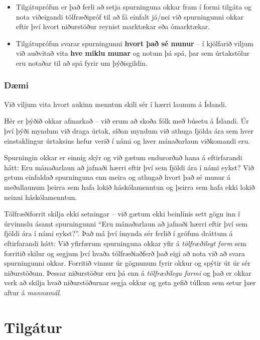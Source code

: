 \documentclass[
]{book}
\theoremstyle{definition}
\theoremstyle{definition}
\theoremstyle{definition}
\theoremstyle{definition}
\theoremstyle{remark}
\begin{document}
\begin{itemize}
  \begin{itemize}
  \item
    Tilgátuprófun er það ferli að setja spurninguna okkar fram í
    formi tilgáta og nota viðeigandi tölfræðipróf til að fá einfalt
    já/nei við spurningunni okkar eftir því hvort niðurstöður
    reynist marktækar eða ómarktækar.
  \item
    Tilgátuprófun svarar spurningunni \textbf{hvort það sé munur} -- í
    kjölfarið viljum við auðvitað vita \textbf{hve miklu munar} og notum
    þá spá, þar sem úrtakstölur eru notaðar til að spá fyrir um
    þýðisgildin.
  \end{itemize}
\end{itemize}

\hypertarget{duxe6mi}{%
\subsection*{Dæmi}\label{duxe6mi}}

Við viljum vita hvort aukinn menntun skili sér í hærri launum á Íslandi.

Hér er þýðið okkar afmarkað -- við erum að skoða fólk með búsetu á
Íslandi. Úr því þýði myndum við draga úrtak, síðan myndum við athuga
fjölda ára sem hver einstaklingur úrtaksins hefur verið í námi og hver
mánaðarlaun viðkomandi eru.

Spurningin okkar er einnig skýr og við gætum endurorðað hana á
eftirfarandi hátt: Eru mánaðarlaun að jafnaði hærri eftir því sem fjöldi
ára í námi eykst? Við getum einfaldað spurninguna enn meira og athugað
hvort það sé munur á meðallaunum þeirra sem hafa lokið háskólamenntun og
þeirra sem hafa ekki lokið neinni háskólamenntun.

Tölfræðiforrit skilja ekki setningar -- við gætum ekki beinlínis sett
gögn inn í úrvinnslu ásamt spurningunni ``Eru mánaðarlaun að jafnaði
hærri eftir því sem fjöldi ára í námi eykst?''. Það má því ímynda sér
ferlið í grófum dráttum á eftirfarandi hátt: Við yfirfærum spurninguna
okkar yfir á \emph{tölfræðilegt form} sem forritið skilur og segjum því hvaða
tölfræðiaðferð það eigi að nota við að svara spurningunni okkar.
Forritið vinnur úr gögnunum fyrir okkur og spýtir út úr sér niðurstöðum.
Þessar niðurstöður eru þá enn á \emph{tölfræðilegu formi} og það er okkar
verk að skilja hvað niðurstöðurnar segja okkur og geta gefið túlkun sem
setur þær aftur á \emph{mannamál}.

\hypertarget{cross}{%
\chapter{Tilgátur}\label{cross}}
\end{document}
